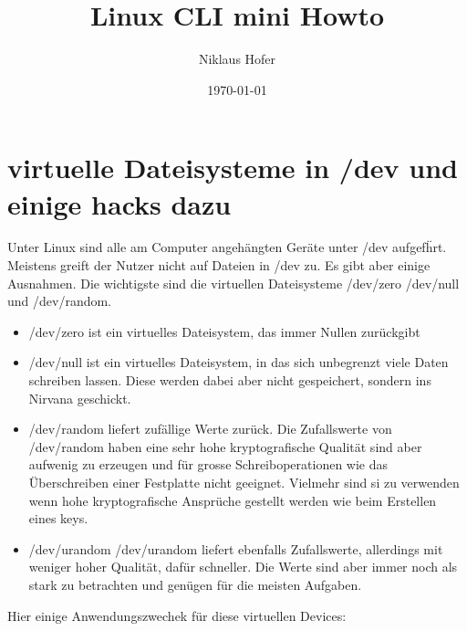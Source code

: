 \documentclass[10pt,paper=a4,final]{scrartcl}
\title{Linux CLI mini Howto}
\author{Niklaus Hofer}
\date{\today}
\begin{document}
\maketitle
\newpage
\flushleft
\tableofcontents
\newpage







\section{virtuelle Dateisysteme in /dev und einige hacks dazu}
Unter Linux sind alle am Computer angeh\"angten Ger\"ate unter /dev aufgef\"hrt. Meistens greift der Nutzer nicht auf Dateien in /dev zu. Es gibt aber einige Ausnahmen. Die wichtigste sind die virtuellen Dateisysteme /dev/zero /dev/null und /dev/random.\\
\begin{itemize}
\item /dev/zero ist ein virtuelles Dateisystem, das immer Nullen zur\"uckgibt
\item /dev/null ist ein virtuelles Dateisystem, in das sich unbegrenzt viele Daten schreiben lassen. Diese werden dabei aber nicht gespeichert, sondern ins Nirvana geschickt.
\item /dev/random liefert zuf\"allige Werte zur\"uck. Die Zufallswerte von /dev/random haben eine sehr hohe kryptografische Qualit\"at sind aber aufwenig zu erzeugen und f\"ur grosse Schreiboperationen wie das \"Uberschreiben einer Festplatte nicht geeignet. Vielmehr sind si zu verwenden wenn hohe kryptografische Anspr\"uche gestellt werden wie beim Erstellen eines keys.
\item /dev/urandom /dev/urandom liefert ebenfalls Zufallswerte, allerdings mit weniger hoher Qualit\"at, daf\"ur schneller. Die Werte sind aber immer noch als stark zu betrachten und gen\"ugen f\"ur die meisten Aufgaben.
\end{itemize}
Hier einige Anwendungszwechek f\"ur diese virtuellen Devices:
\end{document}
